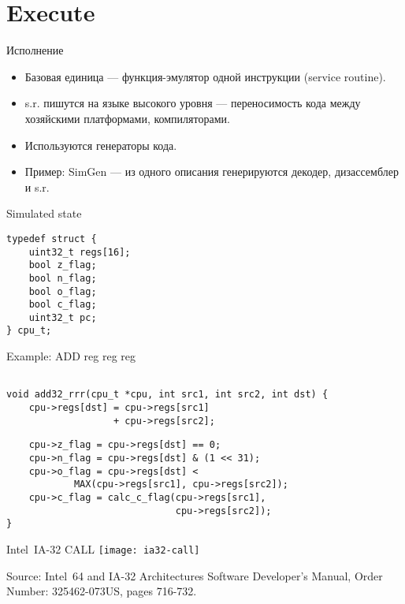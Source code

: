 \section{Execute}

\begin{frame}{Исполнение}
\begin{itemize}
\item Базовая единица --- функция-эмулятор одной инструкции (service routine).
\item s.r. пишутся на языке высокого уровня --- переносимость кода между хозяйскими
платформами, компиляторами.
\item Используются генераторы кода.
\item Пример: SimGen --- из одного описания генерируются декодер, дизассемблер и s.r.
\end{itemize}
\end{frame}

\begin{frame}[fragile]{Simulated state}
\begin{lstlisting}
typedef struct {
    uint32_t regs[16];
    bool z_flag;
    bool n_flag;
    bool o_flag;
    bool c_flag;
    uint32_t pc;
} cpu_t;
\end{lstlisting}
\end{frame}

\begin{frame}[fragile]{Example: ADD reg reg reg}
\begin{lstlisting}

void add32_rrr(cpu_t *cpu, int src1, int src2, int dst) {
    cpu->regs[dst] = cpu->regs[src1]
                   + cpu->regs[src2];
\end{lstlisting}
\pause

\begin{lstlisting}
    cpu->z_flag = cpu->regs[dst] == 0;
    cpu->n_flag = cpu->regs[dst] & (1 << 31);
    cpu->o_flag = cpu->regs[dst] < 
            MAX(cpu->regs[src1], cpu->regs[src2]);
    cpu->c_flag = calc_c_flag(cpu->regs[src1],
                              cpu->regs[src2]);
}
\end{lstlisting}
\end{frame}

\begin{frame}{Intel\reg~IA-32 CALL}
\centering
\texttt{[image: ia32-call]}

\tiny{Source: Intel\reg~64 and IA-32 Architectures Software Developer’s Manual,
      Order Number: 325462-073US, pages 716-732.}
\end{frame}

